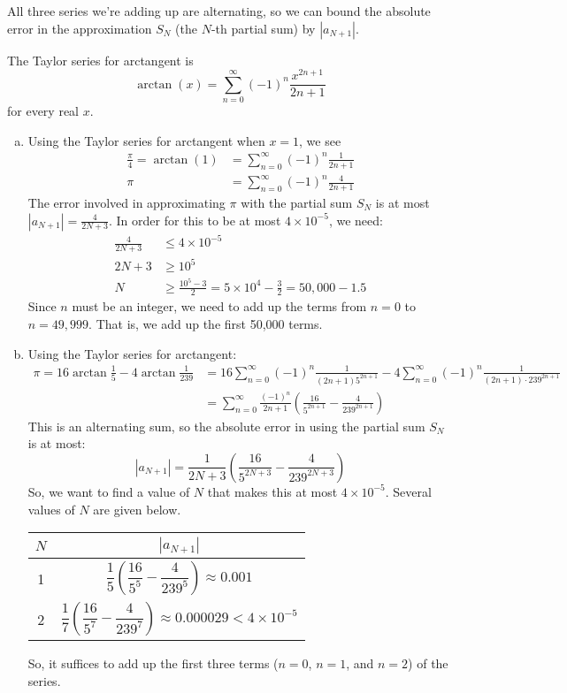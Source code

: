 \begin{solution}
	All three series we're adding up are alternating, so we can bound the absolute error in the approximation $S_N$ (the $N$-th partial sum) by $|a_{N+1}|$.

	The Taylor series for arctangent is
	\[\arctan(x)=\sum_{n=0}^\infty (-1)^n\frac{x^{2n+1}}{2n+1}\]
	for every real $x$.

	\begin{enumerate}[(a)]
	\item
	Using the Taylor series for arctangent when $x=1$, we see
	\begin{align*}
	\frac{\pi}{4}=\arctan(1)&=\sum_{n=0}^\infty(-1)^n \frac{1}{2n+1}\\
	\pi &=\sum_{n=0}^\infty (-1)^n\frac{4}{2n+1}
	\end{align*}
	The error involved in approximating $\pi$ with the partial sum $S_N$ is at most $|a_{N+1}|=\frac{4}{2N+3}$. In order for this to be at most $4\times 10^{-5}$, we need:
	\begin{align*}
	\frac{4}{2N+3}&\le 4\times 10^{-5}\\
	2N+3 &\ge 10^5\\
	N&\ge \frac{10^5-3}{2}=5\times 10^4-\frac{3}{2}=50,000-1.5
	\end{align*}
	Since $n$ must be an integer, we need to add up the terms from $n=0$ to $n=49,999$. That is, we add up the first 50,000 terms.
	\item
	Using the Taylor series for arctangent:
	\begin{align*}
	\pi=16\arctan\frac15-4\arctan\frac{1}{239}&=16\sum_{n=0}^\infty(-1)^n\frac{1}{(2n+1)5^{2n+1}}-
	4\sum_{n=0}^\infty(-1)^n\frac{1}{(2n+1)\cdot 239^{2n+1}}\\
	&=\sum_{n=0}^\infty\frac{(-1)^n}{2n+1}\left(\frac{16}{5^{2n+1}}-\frac{4}{239^{2n+1}} \right)
	\end{align*}
	This is an alternating sum, so the absolute error in using the partial sum $S_N$ is at most:
	\[	|a_{N+1}|=\frac{1}{2N+3}\left(\frac{16}{5^{2N+3}} -\frac{4}{239^{2N+3}}\right) \]
So, we want to find a value of $N$ that makes this at most $4\times 10^{-5}$. Several values of $N$ are given below.
\begin{center}
	\begin{tabular}{|c|c|}
		\hline
		$N$&$|a_{N+1}|$\\
		\hline
		1 & $\dfrac{1}{5}\left(\dfrac{16}{5^5}-\dfrac{4}{239^5} \right)\approx 0.001$\\
		\hline
		2 & $\dfrac{1}{7}\left(\dfrac{16}{5^7}-\dfrac{4}{239^7} \right)\approx 0.000029<4\times 10^{-5}$\\
	\hline
		\end{tabular}
	\end{center}
	So, it suffices to add up the first three terms ($n=0$, $n=1$, and $n=2$) of the series.


\end{enumerate}
\end{solution}
